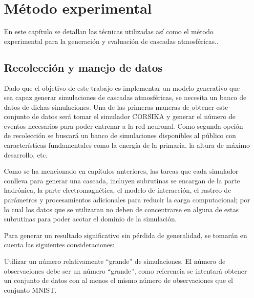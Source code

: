 
\chapter{Método experimental} %

\label{Chapter4} %

En este capítulo se detallan las técnicas utilizadas así como el método experimental para la generación y evaluación de cascadas atmosféricas.. 

\section{Recolección y manejo de datos}

Dado que el objetivo de este trabajo es implementar un modelo generativo que sea capaz generar simulaciones de cascadas atmosféricas, se necesita un banco de datos de dichas simulaciones. Una de las primeras maneras de obtener este conjunto de datos será tomar el simulador CORSIKA y generar el número de eventos necesarios para poder entrenar a la red neuronal. Como segunda opción de recolección se buscará un banco de simulaciones disponibles al público con características fundamentales como la energía de la primaria, la altura de máximo desarrollo, etc.

Como se ha mencionado en capítulos anteriores, las tareas que cada simulador conlleva para generar una cascada, incluyen subrutinas se encargan de la parte hadrónica, la parte electromagnética, el modelo de interacción, el rastreo de parámetros y procesamientos adicionales para reducir la carga computacional; por lo cual los datos que se utilizaran no deben de concentrarse en alguna de estas subrutinas para poder acotar el dominio de la simulación. 


Para generar un resultado significativo sin pérdida de generalidad, se tomarán en cuenta las siguientes consideraciones:

Utilizar un número relativamente “grande” de simulaciones.
El número de observaciones debe ser un número “grande”, como referencia se intentará obtener un conjunto de datos con al menos el mismo número de observaciones que el conjunto MNIST.  

